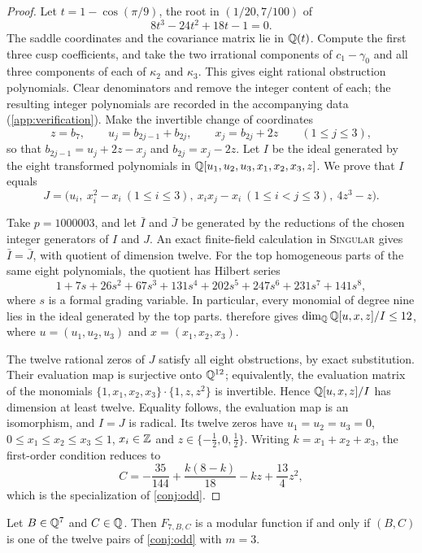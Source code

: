 \begin{proof}
Let $t=1-\cos(\pi/9)$, the root in $(1/20,7/100)$ of
\[
8t^3-24t^2+18t-1=0.
\]
The saddle coordinates and the covariance matrix lie in $\mathbb{Q}(t)$. Compute the first three cusp coefficients, and take the two irrational components of $c_1-\gamma_0$ and all three components of each of $\kappa_2$ and $\kappa_3$. This gives eight rational obstruction polynomials. Clear denominators and remove the integer content of each; the resulting integer polynomials are recorded in the accompanying data (\cref{app:verification}). Make the invertible change of coordinates
\[
z=b_7,\qquad u_j=b_{2j-1}+b_{2j},\qquad x_j=b_{2j}+2z\qquad(1\le j\le3),
\]
so that $b_{2j-1}=u_j+2z-x_j$ and $b_{2j}=x_j-2z$. Let $I$ be the ideal generated by the eight transformed polynomials in $\mathbb{Q}[u_1,u_2,u_3,x_1,x_2,x_3,z]$. We prove that $I$ equals
\begin{equation}\label{eq:r7ideal}
J=\bigl(u_i,\ x_i^2-x_i\ (1\le i\le3),\ x_ix_j-x_i\ (1\le i<j\le3),\ 4z^3-z\bigr).
\end{equation}

Take $p=1000003$, and let $\bar I$ and $\bar J$ be generated by the reductions of the chosen integer generators of $I$ and $J$. An exact finite-field calculation in \textsc{Singular} \cite{Singular} gives $\bar I=\bar J$, with quotient of dimension twelve. For the top homogeneous parts of the same eight polynomials, the quotient has Hilbert series
\[
1+7s+26s^2+67s^3+131s^4+202s^5+247s^6+231s^7+141s^8,
\]
where $s$ is a formal grading variable. In particular, every monomial of degree nine lies in the ideal generated by the top parts.  therefore gives $\dim_{\mathbb{Q}}\mathbb{Q}[u,x,z]/I\le12$, where $u=(u_1,u_2,u_3)$ and $x=(x_1,x_2,x_3)$.

The twelve rational zeros of $J$ satisfy all eight obstructions, by exact substitution. Their evaluation map is surjective onto $\mathbb{Q}^{12}$; equivalently, the evaluation matrix of the monomials $\{1,x_1,x_2,x_3\}\cdot\{1,z,z^2\}$ is invertible. Hence $\mathbb{Q}[u,x,z]/I$ has dimension at least twelve. Equality follows, the evaluation map is an isomorphism, and $I=J$ is radical. Its twelve zeros have $u_1=u_2=u_3=0$, $0\le x_1\le x_2\le x_3\le1$, $x_i\in\mathbb{Z}$ and $z\in\{-\frac12,0,\frac12\}$. Writing $k=x_1+x_2+x_3$, the first-order condition reduces to
\[
C=-\frac{35}{144}+\frac{k(8-k)}{18}-kz+\frac{13}4z^2,
\]
which is the specialization of \cref{conj:odd}.
\end{proof}

\begin{corollary}\label{cor:r7}
Let $B\in\mathbb{Q}^7$ and $C\in\mathbb{Q}$. Then $F_{7,B,C}$ is a modular function if and only if $(B,C)$ is one of the twelve pairs of \cref{conj:odd} with $m=3$.
\end{corollary}

